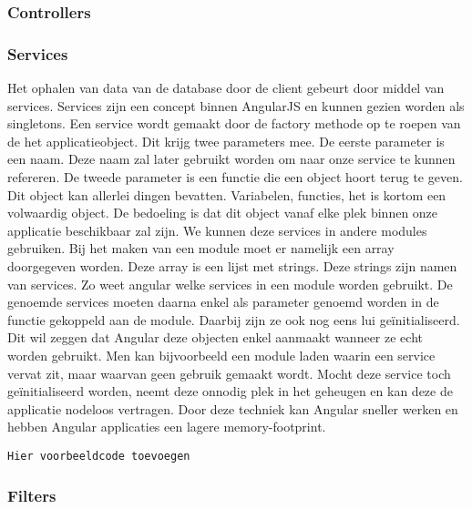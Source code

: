 \documentclass[a4paper,11pt]{article}
\begin{document}
\subsubsection{Controllers}


\subsubsection{Services}
Het ophalen van data van de database door de client gebeurt door middel van services. Services zijn een concept binnen AngularJS en kunnen gezien worden als singletons. Een service wordt gemaakt door de factory methode op te roepen van de het applicatieobject. Dit krijg twee parameters mee. De eerste parameter is een naam. Deze naam zal later gebruikt worden om naar onze service te kunnen refereren. De tweede parameter is een functie die een object hoort terug te geven. Dit object kan allerlei dingen bevatten. Variabelen, functies, het is kortom een volwaardig object. De bedoeling is dat dit object vanaf elke plek binnen onze applicatie beschikbaar zal zijn. We kunnen deze services in andere modules gebruiken. Bij het maken van een module moet er namelijk een array doorgegeven worden. Deze array is een lijst met strings. Deze strings zijn namen van services. Zo weet angular welke services in een module worden gebruikt. De genoemde services moeten daarna enkel als parameter genoemd worden in de functie gekoppeld aan de module. Daarbij zijn ze ook nog eens lui geïnitialiseerd. Dit wil zeggen dat Angular deze objecten enkel aanmaakt wanneer ze echt worden gebruikt. Men kan bijvoorbeeld een module laden waarin een service vervat zit, maar waarvan geen gebruik gemaakt wordt. Mocht deze service toch geïnitialiseerd worden, neemt deze onnodig plek in het geheugen en kan deze de applicatie nodeloos vertragen. Door deze techniek kan Angular sneller werken en hebben Angular applicaties een lagere memory-footprint.

\begin{verbatim}
Hier voorbeeldcode toevoegen
\end{verbatim}

\subsubsection{Filters}
\end{document}
